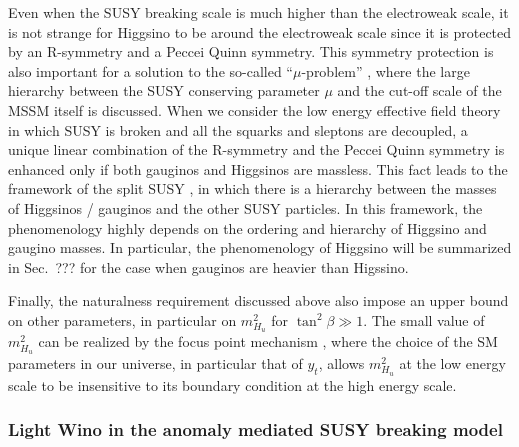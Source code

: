 \documentclass[12pt,twoside,book]{article}
\begin{document}
Even when the SUSY breaking scale is much higher than the electroweak scale, it is not strange for Higgsino to be around the electroweak scale since it is protected by an R-symmetry and a Peccei Quinn symmetry.  
This symmetry protection is also important for a solution to the so-called ``$\mu$-problem'' \cite{Giudice:1988yz}, where the large hierarchy between the SUSY conserving parameter $\mu$ and the cut-off scale of the MSSM itself is discussed.
When we consider the low energy effective field theory in which SUSY is broken and all the squarks and sleptons are decoupled, a unique linear combination of the R-symmetry and the Peccei Quinn symmetry is enhanced only if both gauginos and Higgsinos are massless.
This fact leads to the framework of the split SUSY \cite{Giudice:2004tc}, in which there is a hierarchy between the masses of Higgsinos / gauginos and the other SUSY particles.
In this framework, the phenomenology highly depends on the ordering and hierarchy of Higgsino and gaugino masses.
In particular, the phenomenology of Higgsino will be summarized in Sec.~???  for the case when gauginos are heavier than Higssino.

Finally, the naturalness requirement discussed above also impose an upper bound on other parameters, in particular on $m_{H_u}^2$ for $\tan^2 \beta \gg 1$.
The small value of $m_{H_u}^2$ can be realized by the focus point mechanism \cite{Feng:1999hg, Feng:1999mn, Feng:1999zg}, where the choice of the SM parameters in our universe, in particular that of $y_t$, allows $m_{H_u}^2$ at the low energy scale to be insensitive to its boundary condition at the high energy scale.


\subsubsection*{Light Wino in the anomaly mediated SUSY breaking model}
\end{document}
